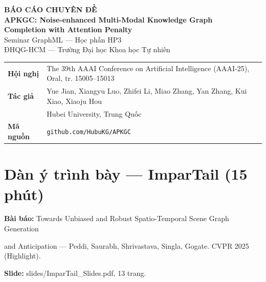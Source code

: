 \documentclass[11pt,a4paper]{article}
\newcommand{\code}[1]{{\ttfamily\small\color{codetext}#1}}
\begin{document}
\begin{center}
  {\sffamily\LARGE\bfseries\color{hcmusblue} BÁO CÁO CHUYÊN ĐỀ}\\[8pt]
  {\sffamily\large\bfseries APKGC: Noise-enhanced Multi-Modal Knowledge Graph\\
   Completion with Attention Penalty}\\[10pt]
  {\small Seminar GraphML --- Học phần HP3}\\[2pt]
  {\small ĐHQG-HCM --- Trường Đại học Khoa học Tự nhiên}
\end{center}

\vspace{4pt}
\begin{center}\small
\begin{tabular}{@{}ll@{}}
  \toprule
  \textbf{Hội nghị} & The 39th AAAI Conference on Artificial Intelligence
                      (AAAI-25), Oral, tr. 15005--15013\\
  \textbf{Tác giả}  & Yue Jian, Xiangyu Luo, Zhifei Li, Miao Zhang, Yan Zhang,
                      Kui Xiao, Xiaoju Hou\\
                    & Hubei University, Trung Quốc\\
  \textbf{Mã nguồn} & \texttt{github.com/HubuKG/APKGC}\\
  \bottomrule
\end{tabular}
\end{center}

\vspace{6pt}
\section{Dàn ý trình bày --- ImparTail (15 phút)}
\textbf{Bài báo:} Towards Unbiased and Robust Spatio-Temporal Scene Graph Generation

and Anticipation --- Peddi, Saurabh, Shrivastava, Singla, Gogate. CVPR 2025 (Highlight).

\textbf{Slide:} \code{slides/ImparTail\_Slides.pdf}, 13 trang.
\end{document}
